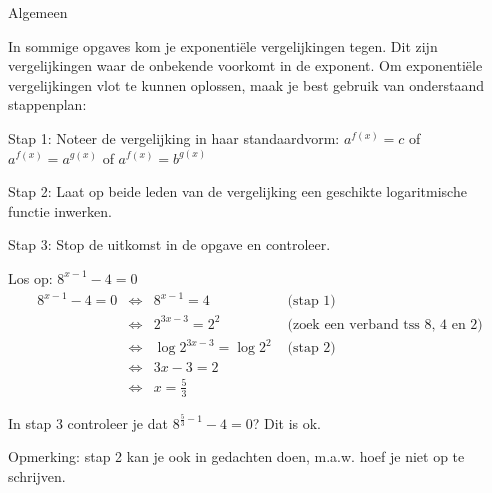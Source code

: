 Algemeen

In sommige opgaves kom je exponenti\"ele vergelijkingen tegen. Dit zijn
vergelijkingen waar de onbekende voorkomt in de exponent. Om exponenti\"ele
vergelijkingen vlot te kunnen oplossen, maak je best gebruik van onderstaand
stappenplan:

Stap 1: Noteer de vergelijking in haar standaardvorm: $ a^{f(x)}=c$
of $ a^{f(x)}=a^{g(x)}$ of $ a^{f(x)}=b^{g(x)}$ 

Stap 2: Laat op beide leden van de vergelijking een geschikte logaritmische
functie inwerken.

Stap 3: Stop de uitkomst in de opgave en controleer.

\begin{voorbeeld}

Los op: $8^{x-1}-4=0$
\begin{equation*}
 \begin{array}{rclr}
 8^{x-1}-4=0 &
	\iff & 8^{x-1} = 4 & \text{ (stap 1)}\\
	& \iff & 2^{3x-3} = 2^{2} & \text{ (zoek een verband tss 8, 4 en 2)}\\
	& \iff & \log2^{3x-3} = \log2^{2} & \text{ (stap 2)}\\
	& \iff & 3x-3 = 2 & \text{}\\
	& \iff & x = \frac{5}{3}
	\end{array}
\end{equation*}

In stap 3 controleer je dat $ 8^{\frac{5}{3}-1}-4=0$?
Dit is ok.

Opmerking: stap 2 kan je ook in gedachten doen, m.a.w. hoef je niet
op te schrijven.

\end{voorbeeld}
